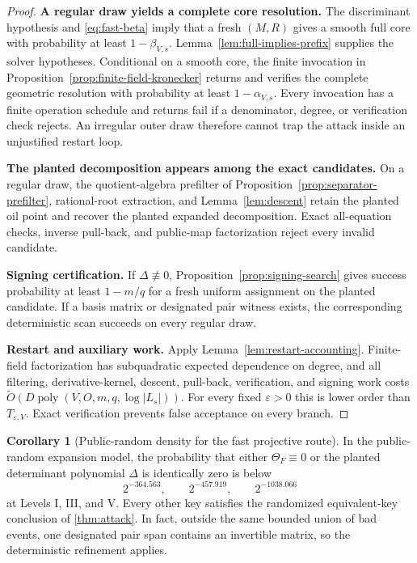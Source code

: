 \documentclass[11pt,a4paper]{article}
\theoremstyle{definition}
\newtheorem{corollary}[theorem]{Corollary}
\theoremstyle{remark}
\newcommand{\proofstep}[1]{\par\smallskip\noindent\textbf{#1}\enspace}
\begin{document}
\begin{proof}
\proofstep{A regular draw yields a complete core resolution.}
The discriminant hypothesis and \eqref{eq:fast-beta} imply that a fresh $(M,R)$ gives a smooth full core with probability at least $1-\beta_{V,s}$.  Lemma~\ref{lem:full-implies-prefix} supplies the solver hypotheses.  Conditional on a smooth core, the finite invocation in Proposition~\ref{prop:finite-field-kronecker} returns and verifies the complete geometric resolution with probability at least $1-\alpha_{V,s}$.  Every invocation has a finite operation schedule and returns \textsf{fail} if a denominator, degree, or verification check rejects.  An irregular outer draw therefore cannot trap the attack inside an unjustified restart loop.

\proofstep{The planted decomposition appears among the exact candidates.}
On a regular draw, the quotient-algebra prefilter of Proposition~\ref{prop:separator-prefilter}, rational-root extraction, and Lemma~\ref{lem:descent} retain the planted oil point and recover the planted expanded decomposition.  Exact all-equation checks, inverse pull-back, and public-map factorization reject every invalid candidate.

\proofstep{Signing certification.}
If $\Delta\not\equiv0$, Proposition~\ref{prop:signing-search} gives success probability at least $1-m/q$ for a fresh uniform assignment on the planted candidate.  If a basis matrix or designated pair witness exists, the corresponding deterministic scan succeeds on every regular draw.

\proofstep{Restart and auxiliary work.}
Apply Lemma~\ref{lem:restart-accounting}.  Finite-field factorization has subquadratic expected dependence on degree, and all filtering, derivative-kernel, descent, pull-back, verification, and signing work costs $\widetilde O(D\operatorname{poly}(V,O,m,q,\log|L_s|))$.  For every fixed $\varepsilon>0$ this is lower order than $T_{\varepsilon,V}$.  Exact verification prevents false acceptance on every branch.
\end{proof}

\begin{corollary}[Public-random density for the fast projective route]\label{cor:ideal-recovery}
In the public-random expansion model, the probability that either $\Theta_F\equiv0$ or the planted determinant polynomial $\Delta$ is identically zero is below
\[
2^{-364.563},\qquad2^{-457.919},\qquad2^{-1038.066}
\]
at Levels I, III, and V.  Every other key satisfies the randomized equivalent-key conclusion of \cref{thm:attack}.  In fact, outside the same bounded union of bad events, one designated pair span contains an invertible matrix, so the deterministic refinement applies.
\end{corollary}
\end{document}
